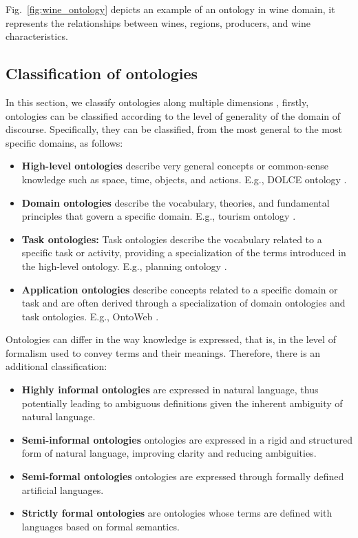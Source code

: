 Fig.~\ref{fig:wine_ontology} depicts an example of an ontology in wine domain, it represents the relationships between wines, regions, producers, and wine characteristics.
\subsection{Classification of ontologies}

In this section, we classify ontologies along multiple dimensions \cite{canfora2004ontologie}, firstly, ontologies can be classified according to the level of generality of the domain of discourse.
Specifically, they can be classified, from the most general to the most specific domains, as follows:
\begin{itemize}
    \item \textbf{High-level ontologies} describe very general concepts or common-sense knowledge such as space, time, objects, and actions. E.g., DOLCE ontology \cite{borgo2022dolce}.
    
    \item \textbf{Domain ontologies} describe the vocabulary, theories, and fundamental principles that govern a specific domain. E.g., tourism ontology \cite{tourismOntology2013}.

    \item \textbf{Task ontologies:} Task ontologies describe the vocabulary related to a specific task or activity, providing a specialization of the terms introduced in the high-level ontology. E.g., planning ontology \cite{taskOntologyPlanning}.

    \item \textbf{Application ontologies} describe concepts related to a specific domain or task and are often derived through a specialization of domain ontologies and task ontologies. E.g., OntoWeb \cite{ontoweb2002}.
\end{itemize}
Ontologies can differ in the way knowledge is expressed, that is, in the level of formalism used to convey terms and their meanings. Therefore, there is an additional classification:
\begin{itemize}
    \item \textbf{Highly informal ontologies} are expressed in natural language, thus potentially leading to ambiguous definitions given the inherent ambiguity of natural language.

    \item \textbf{Semi-informal ontologies} ontologies are expressed in a rigid and structured form of natural language, improving clarity and reducing ambiguities.

    \item \textbf{Semi-formal ontologies} ontologies are expressed through formally defined artificial languages.

    \item \textbf{Strictly formal ontologies} are ontologies whose terms are defined with languages based on formal semantics.
    
\end{itemize}

